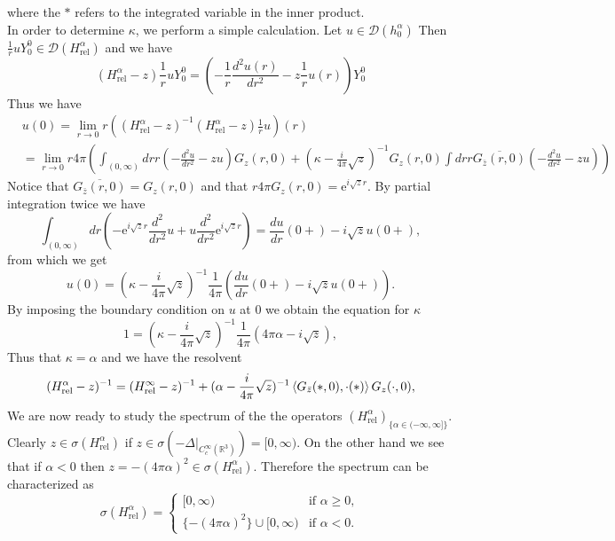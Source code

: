 \documentclass[a4paper,11pt]{article}
\newcommand{\euler}[1]{\text{e}^{#1}}
\newcommand{\dom}[1]{\mathscr D\left(#1\right)}
\newcommand{\R}{\mathbb{R}}
\numberwithin{equation}{section}
\begin{document}
where the $ \ast $ refers to the integrated variable in the inner product.\\
In order to determine $ \kappa $, we perform a simple calculation. Let $ u\in\dom{h^\alpha_0} $ Then $ \frac{1}{r}uY_0^0\in\dom{H_\text{rel}^\alpha} $ and we have \begin{equation}
(H_\text{rel}^\alpha-z)\frac{1}{r}uY_0^0=\left(-\frac{1}{r}\frac{d^2u(r)}{dr^2}-z\frac{1}{r}u(r)\right)Y^0_0
\end{equation}
Thus we have \begin{equation}
\begin{aligned}
&u(0)=\lim\limits_{r\to0}r\left((H_\text{rel}^\alpha-z)^{-1}(H_\text{rel}^\alpha-z)\frac{1}{r}u\right)(r)\\&=\lim\limits_{r\to0}r4\pi\left(\int_{(0,\infty)}drr \left(-\frac{d^2u}{dr^2}-zu\right)G_z(r,0)+(\kappa-\frac{i}{4\pi}\sqrt{z})^{-1}G_z(r,0)\int dr r\overline{G_{\bar{z}}(r,0)}\left(-\frac{d^2u}{dr^2}-zu\right)\right)
\end{aligned}
\end{equation}
Notice that $ \overline{G_{\bar{z}}(r,0)}=G_z(r,0) $ and that $ r4\pi G_z(r,0)=\euler{i\sqrt{z}r} $. By partial integration twice we have
\begin{equation}
\int_{(0,\infty)}dr \left(-\euler{i\sqrt{z}r}\frac{d^2}{dr^2}u+u\frac{d^2}{dr^2}\euler{i\sqrt{z}r}\right)=\frac{du}{dr}(0+)-i\sqrt{z}u(0+),
\end{equation}
from which we get
\begin{equation}
u(0)=(\kappa-\frac{i}{4\pi}\sqrt{z})^{-1}\frac{1}{4\pi}\left(\frac{du}{dr}(0+)-i\sqrt{z}u(0+)\right).
\end{equation}
By imposing the boundary condition on $ u $ at $ 0 $ we obtain the equation for $ \kappa $\begin{equation}
1=(\kappa-\frac{i}{4\pi}\sqrt{z})^{-1}\frac{1}{4\pi}\left(4\pi\alpha-i\sqrt{z}\right),
\end{equation}
Thus that $ \kappa=\alpha $ and we have the resolvent \begin{equation}
(H_{\text{rel}}^\alpha-z)^{-1}=(H_{\text{rel}}^\infty-z)^{-1}+(\alpha-\frac{i}{4\pi}\sqrt{z})^{-1}\braket{G_{\bar{z}}(\ast,0),\cdot(\ast)}G_z(\cdot,0),
\end{equation}
We are now ready to study the spectrum of the the operators $ (H_{\text{rel}}^\alpha)_{\{\alpha\in(-\infty,\infty]\}} $. Clearly $ z\in\sigma(H_{\text{rel}}^\alpha) $ if $ z\in\sigma(-\Delta|_{C_c^\infty(\R^3)})=[0,\infty) $. On the other hand we see that if $ \alpha<0 $ then $ z=-(4\pi\alpha)^2\in\sigma(H_{\text{rel}}^\alpha) $. Therefore the spectrum can be characterized as\begin{equation}
\sigma(H_{\text{rel}}^\alpha)=\begin{cases}
[0,\infty)&\text{if }\alpha\geq0,\\
\{-(4\pi\alpha)^2\}\cup[0,\infty)&\text{if }\alpha<0.
\end{cases}
\end{equation}
\end{document}
